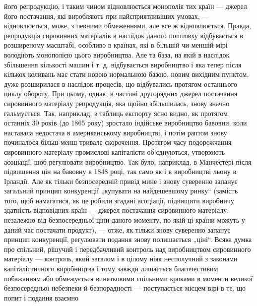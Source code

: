 \parcont{}  %
його репродукцію, і таким чином відновлюється монополія тих
країн — джерел його постачання, які виробляють при найсприятливіших
умовах, — відновлюється, може, з певними обмеженнями,
але все ж відновлюється. Правда, репродукція сировинних
матеріалів в наслідок даного поштовху відбувається в розширеному
масштабі, особливо в країнах, які в більшій чи меншій мірі
володіють монополією цього виробництва. Але та база, на якій в наслідок
збільшення кількості машин і т. д. відбувається виробництво
і яка тепер після кількох коливань має стати новою нормальною
базою, новим вихідним пунктом, дуже розширилася в наслідок
процесів, що відбувались протягом останнього циклу обороту.
При цьому, однак, в частині другорядних джерел постачання
сировинного матеріалу репродукція, яка щойно збільшилась, знову
значно гальмується. Так, наприклад, з таблиць експорту ясно
видно, як протягом останніх 30 років (до 1865 року) зростало
індійське виробництво бавовни, коли наставала недостача в американському
виробництві, і потім раптом знову починалося
більш-менш тривале скорочення. Протягом часу подорожчання
сировинного матеріалу промислові капіталісти об’єднуються,
утворюють асоціації, щоб регулювати виробництво. Так було,
наприклад, в Манчестері після підвищення цін на бавовну в
1848 році, так само як і в виробництві льону в Ірландії. Але як
тільки безпосередній привід мине і знову суверенно запанує загальний
принцип конкуренції „купувати на найдешевшому ринку“
(замість того, щоб намагатися, як це робили згадані асоціації,
підвищити виробничу здатність відповідних країн — джерел постачання
сировинного матеріалу, незалежно від безпосередньої
ціни даного моменту, по якій ці країни можуть у даний час постачати
продукт), — отже, як тільки знову суверенно запанує
принцип конкуренції, регулювати подання знову полишається
„ціні“. Всяка думка про спільний, рішучий і передбачливий контроль
над виробництвом сировинного матеріалу — контроль,
який загалом і в цілому ніяк несполучний з законами капіталістичного
виробництва і тому завжди лишається благочестивим
побажанням або обмежується винятковими спільними кроками
в моменти великої безпосередньої небезпеки й безпорадності —
поступається місцем вірі в те, що попит і подання взаємно
